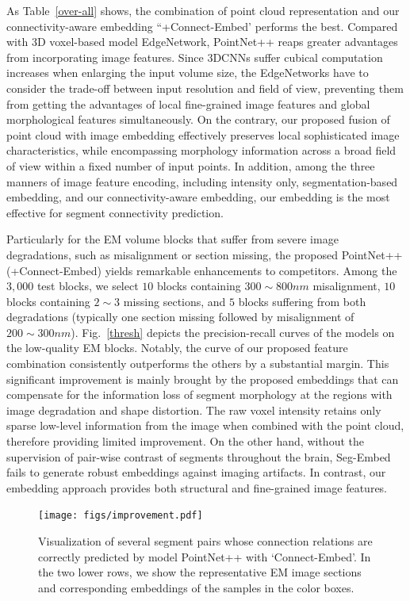 As Table~\ref{over-all} shows, the combination of point cloud representation and our connectivity-aware embedding ``+Connect-Embed' performs the best. 
Compared with 3D voxel-based model EdgeNetwork, PointNet++ reaps greater advantages from incorporating image features. 
Since 3DCNNs suffer cubical computation increases when enlarging the input volume size, the EdgeNetworks have to consider the trade-off between input resolution and field of view, preventing them from getting the advantages of local fine-grained image features and global morphological features simultaneously. 
On the contrary, our proposed fusion of point cloud with image embedding effectively preserves local sophisticated image characteristics, while encompassing morphology information across a broad field of view within a fixed number of input points. 
%
In addition, among the three manners of image feature encoding, including intensity only, segmentation-based embedding, and our connectivity-aware embedding, our embedding is the most effective for segment connectivity prediction. %


Particularly for the EM volume blocks that suffer from severe image degradations, such as misalignment or section missing, the proposed PointNet++ (+Connect-Embed) yields remarkable enhancements to competitors. 
Among the $3,000$ test blocks, we select $10$ blocks containing $300\!\sim\!800nm$ misalignment, $10$ blocks containing $2\!\sim\!3$ missing sections, and $5$ blocks suffering from both degradations (typically one section missing followed by misalignment of $200\!\sim\!300nm$). 
%
Fig.~\ref{thresh} depicts the precision-recall curves of the models on the low-quality EM blocks.
Notably, the curve of our proposed feature combination consistently outperforms the others by a substantial margin.
This significant improvement is mainly brought by the proposed embeddings that can compensate for the information loss of segment morphology at the regions with image degradation and shape distortion. The raw voxel intensity retains only sparse low-level information from the image when combined with the point cloud, therefore providing limited improvement. On the other hand, without the supervision of pair-wise contrast of segments throughout the brain, Seg-Embed \cite{lee2021learning} fails to generate robust embeddings against imaging artifacts. In contrast, our embedding approach provides both structural and fine-grained image features.

\begin{figure}[t]
    \centering
    \texttt{[image: figs/improvement.pdf]}
    \caption{Visualization of several segment pairs whose connection relations are correctly predicted by model PointNet++ with `Connect-Embed'. In the two lower rows, we show the representative EM image sections and corresponding embeddings of the samples in the color boxes. }
    \label{visual}
\end{figure}


